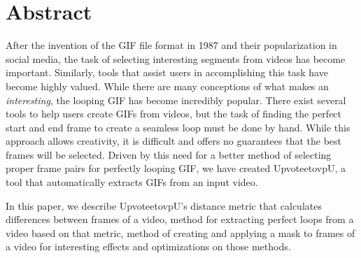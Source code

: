 \section{Abstract}
\label{sec:Abstract}
After the invention of the GIF file format in 1987 and their popularization in social media, the task of selecting interesting segments from videos has become important. Similarly, tools that assist users in accomplishing this task have become highly valued. While there are many conceptions of what makes an \textit{interesting}, the looping GIF has become incredibly popular. There exist several tools to help users create GIFs from videos, but the task of finding the perfect start and end frame to create a seamless loop must be done by hand. While this approach allows creativity, it is difficult and offers no guarantees that the best frames will be selected. Driven by this need for a better method of selecting proper frame pairs for perfectly looping GIF, we have created UpvoteetovpU, a tool that automatically extracts GIFs from an input video. 

In this paper, we describe UpvoteetovpU's distance metric that calculates differences between frames of a video, method for extracting perfect loops from a video based on that metric, method of creating and applying a mask to frames of a video for interesting effects and optimizations on those methods.
